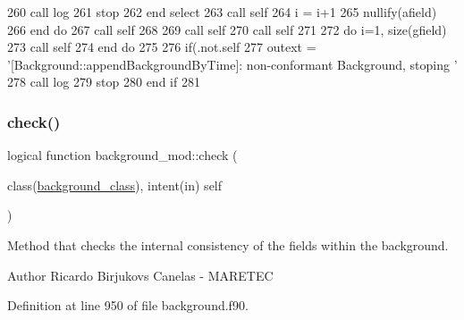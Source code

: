 \begin{DoxyCode}
260             \textcolor{keyword}{call }log%
261             stop
262 \textcolor{keywordflow}{        end select}
263         \textcolor{keyword}{call }self%
264         i = i+1
265         \textcolor{keyword}{nullify}(afield)
266 \textcolor{keywordflow}{    end do}
267     \textcolor{keyword}{call }self%
268 
269     \textcolor{keyword}{call }self%
270     \textcolor{keyword}{call }self%
271 
272     \textcolor{keywordflow}{do} i=1, \textcolor{keyword}{size}(gfield)
273         \textcolor{keyword}{call }self%
274 \textcolor{keywordflow}{    end do}
275 
276     \textcolor{keywordflow}{if}(.not.self%
277         outext = \textcolor{stringliteral}{'[Background::appendBackgroundByTime]: non-conformant Background, stoping '}
278         \textcolor{keyword}{call }log%
279         stop
280 \textcolor{keywordflow}{    end if}
281 
\end{DoxyCode}
\mbox{\label{namespacebackground__mod_af2f517e4aa946491744e012153045bd4}} 
\subsubsection{\texorpdfstring{check()}{check()}}
{\footnotesize\ttfamily logical function background\+\_\+mod\+::check (\begin{DoxyParamCaption}\item[{class(\mbox{\hyperlink{structbackground__mod_1_1background__class}{background\+\_\+class}}), intent(in)}]{self }\end{DoxyParamCaption})\hspace{0.3cm}{\ttfamily [private]}}



Method that checks the internal consistency of the fields within the background. 

\begin{DoxyAuthor}{Author}
Ricardo Birjukovs Canelas -\/ M\+A\+R\+E\+T\+EC 
\end{DoxyAuthor}


Definition at line 950 of file background.\+f90.


